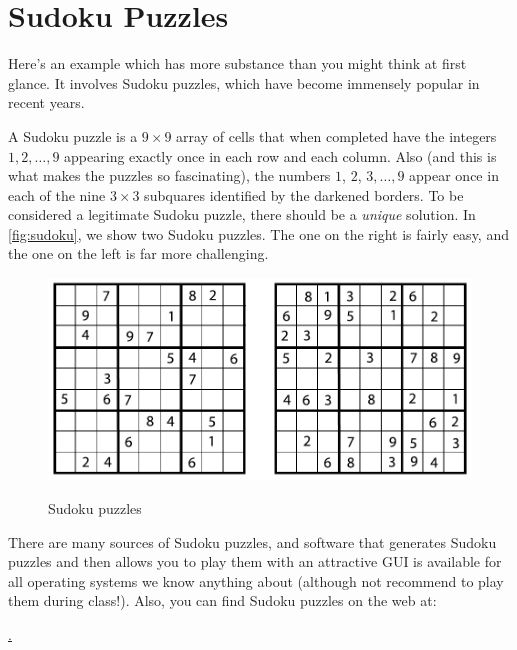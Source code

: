\section{Sudoku Puzzles}\label{s:intro:sudoku}

Here's an example which has more substance than you might
think at first glance.  It involves Sudoku puzzles, which
have become immensely popular in recent years.
\begin{example}
  A Sudoku puzzle is a $9\times 9$ array of cells that when completed
  have the integers $1,2,\dots,9$ appearing exactly once in each row
  and each column.  Also (and this is what makes the puzzles so
  fascinating), the numbers $1$, $2$, $3,\dots,9$ appear once in each
  of the nine $3\times 3$ subquares identified by the darkened
  borders.  To be considered a legitimate Sudoku puzzle, there should
  be a \textit{unique} solution.  In \autoref{fig:sudoku}, we show two
  Sudoku puzzles.  The one on the right is fairly easy, and the one on
  the left is far more challenging.

\begin{figure}[hb]
\begin{center}
\includegraphics[scale=.8]{intro-figs/mysudoku}\\
\end{center}
\caption{Sudoku puzzles}
\label{fig:sudoku}
\end{figure}

There are many sources of Sudoku puzzles, and software that generates
Sudoku puzzles and then allows you to play them with an attractive GUI
is available for all operating systems we know anything about (although
not recommend to play them during class!).  Also, you can find 
Sudoku puzzles on the web at:

\medskip
\begin{center}
\href{http://www.websudoku.com}.
\end{center}


\end{example}
